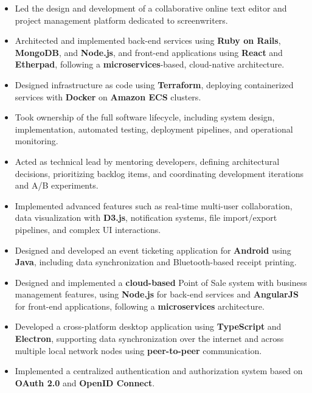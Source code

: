 \documentclass[10pt,a4paper,ragged2e]{altacv}
\begin{document}
\begin{itemize}
	\item Led the design and development of a collaborative online text editor and project management platform dedicated to screenwriters.
	\item Architected and implemented back-end services using \textbf{Ruby on Rails}, \textbf{MongoDB}, and \textbf{Node.js}, and front-end applications using \textbf{React} and \textbf{Etherpad}, following a \textbf{microservices}-based, cloud-native architecture.
	\item Designed infrastructure as code using \textbf{Terraform}, deploying containerized services with \textbf{Docker} on \textbf{Amazon ECS} clusters.
	\item Took ownership of the full software lifecycle, including system design, implementation, automated testing, deployment pipelines, and operational monitoring.
	\item Acted as technical lead by mentoring developers, defining architectural decisions, prioritizing backlog items, and coordinating development iterations and A/B experiments.
	\item Implemented advanced features such as real-time multi-user collaboration, data visualization with \textbf{D3.js}, notification systems, file import/export pipelines, and complex UI interactions.
\end{itemize}

\divider%

\begin{itemize}
	\item Designed and developed an event ticketing application for \textbf{Android} using \textbf{Java}, including data synchronization and Bluetooth-based receipt printing.
	\item Designed and implemented a \textbf{cloud-based} Point of Sale system with business management features, using \textbf{Node.js} for back-end services and \textbf{AngularJS} for front-end applications, following a \textbf{microservices} architecture.
	\item Developed a cross-platform desktop application using \textbf{TypeScript} and \textbf{Electron}, supporting data synchronization over the internet and across multiple local network nodes using \textbf{peer-to-peer} communication.
	\item Implemented a centralized authentication and authorization system based on \textbf{OAuth 2.0} and \textbf{OpenID Connect}.
\end{itemize}
\end{document}
